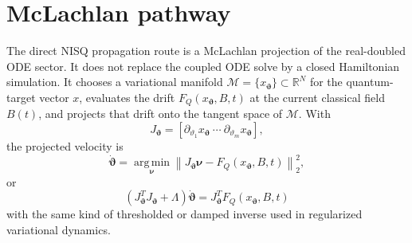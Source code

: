 \documentclass[
  reprint,
  amsmath,
  amssymb,
  aps,
  pra,
  nofootinbib,
  superscriptaddress,
  floatfix
]{revtex4-2}
\newcommand{\argmin}{\operatorname*{arg\,min}}
\begin{document}
\section{McLachlan pathway}
\label{sec:mclachlan_pathway}

The direct NISQ propagation route is a McLachlan projection of the
real-doubled ODE sector.  It does not replace the coupled ODE solve by a
closed Hamiltonian simulation.  It chooses a variational manifold
\(\mathcal M=\{x_{\bm\vartheta}\}\subset\mathbb R^N\) for the
quantum-target vector \(x\), evaluates the drift \(F_Q(x_{\bm\vartheta},B,t)\)
at the current classical field \(B(t)\), and projects that drift onto the
tangent space of \(\mathcal M\).  With
\begin{equation}
J_{\bm\vartheta}
=
\left[
\partial_{\vartheta_1}x_{\bm\vartheta}\ \cdots\
\partial_{\vartheta_m}x_{\bm\vartheta}
\right],
\end{equation}
the projected velocity is
\begin{equation}
\dot{\bm\vartheta}
=
\argmin_{\bm\nu}
\left\|J_{\bm\vartheta}\bm\nu
-F_Q(x_{\bm\vartheta},B,t)\right\|_2^2 ,
\label{eq:paper_v_mclachlan_argmin}
\end{equation}
or
\begin{equation}
\left(J_{\bm\vartheta}^{T}J_{\bm\vartheta}+\Lambda\right)
\dot{\bm\vartheta}
=
J_{\bm\vartheta}^{T}F_Q(x_{\bm\vartheta},B,t)
\label{eq:paper_v_mclachlan_normal}
\end{equation}
with the same kind of thresholded or damped inverse used in regularized
variational dynamics.
\end{document}
